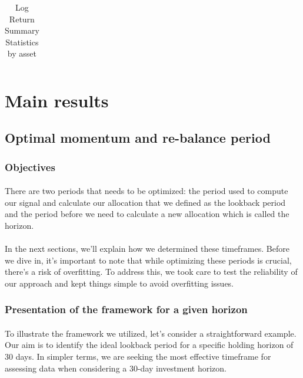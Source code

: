 \documentclass{article}
\begin{document}
\begin{table}[H]
\begin{tabular}{p{3cm}|p{1.5cm}|p{1.5cm}|p{1.5cm}|p{1.5cm}|p{1.5cm}|p{1.5cm}|p{1.5cm}|p{1.5cm}}
 \bottomrule
\end{tabular}
  \label{tab:volneutmom172meanvar}
   \caption{Log Return Summary Statistics by asset}
\end{table}





\section{Main results}\label{sec:mainres}
\subsection{Optimal momentum and re-balance period}
\subsubsection{Objectives}
\paragraph{}
There are two periods that needs to be optimized: the period used to compute our signal and calculate our allocation that we defined as the lookback period and the period before we need to calculate a new allocation which is called the horizon. 

\paragraph{}
In the next sections, we'll explain how we determined these timeframes. Before we dive in, it's important to note that while optimizing these periods is crucial, there's a risk of overfitting. To address this, we took care to test the reliability of our approach and kept things simple to avoid overfitting issues.

\subsubsection{Presentation of the framework for a given horizon}
\paragraph{}
To illustrate the framework we utilized, let's consider a straightforward example. Our aim is to identify the ideal lookback period for a specific holding horizon of 30 days. In simpler terms, we are seeking the most effective timeframe for assessing data when considering a 30-day investment horizon.
\end{document}
